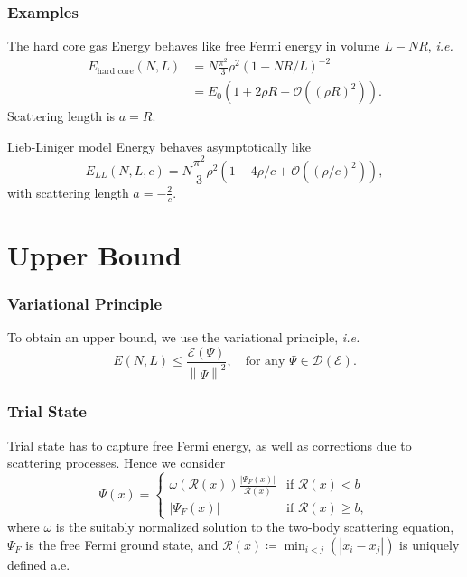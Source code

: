 \documentclass{beamer}[10]
\newcommand{\norm}[1]{\left\lVert #1 \right\rVert}
\newcommand{\abs}[1]{\left\lvert #1 \right\rvert}
\newcommand{\ie}{\emph{i.e.} }
\newcommand{\rr}{\mathcal{R}}
\begin{document}
\begin{frame}
	\frametitle{Examples}
	\small
	\begin{block}{The hard core gas}
		Energy behaves like free Fermi energy in volume $ L-NR $, \ie \begin{equation}
		\begin{aligned}
		E_{\text{hard core}}(N,L)&=N\frac{\pi^2}{3}\rho^2 (1-NR/L)^{-2}\\&= E_0\left(1+2\rho R+\mathcal{O}\left((\rho R)^2\right)\right).
		\end{aligned}
		\end{equation}
		Scattering length is $ a=R $.
	\end{block}
	\begin{block}{Lieb-Liniger model}
		Energy behaves asymptotically like
		\begin{equation}
		E_{LL}(N,L,c)=N\frac{\pi^2}{3}\rho^2\left(1-4\rho/c+\mathcal{O}\left((\rho/c)^2\right)\right),
		\end{equation}
		with scattering length $ a=-\frac{2}{c} $.
	\end{block}
\end{frame}

\section{Upper Bound}

\begin{frame}
	\frametitle{Variational Principle}
	\begin{block}{}
		To obtain an upper bound, we use the variational principle, \ie
		$$
		E(N,L)\leq \frac{\mathcal{E}(\Psi)}{\norm{\Psi}^2},\quad \text{for any }  \Psi\in \mathcal{D}(\mathcal{E}) .
		$$
	\end{block}	
\end{frame}

\begin{frame}
	\frametitle{Trial State}
	\begin{block}{}
		Trial state has to capture free Fermi energy, as well as corrections due to scattering processes. Hence we consider $$
		\Psi(x)=\begin{cases}
		\omega(\rr(x))\frac{\abs{\Psi_F(x)}}{\rr(x)}& \text{if }\rr(x)<b\\
		\abs{\Psi_F(x)}&\text{if }\rr(x)\geq b,
		\end{cases}
		$$
		where $ \omega $ is the suitably normalized solution to the two-body scattering equation,  $\Psi_F$ is the free Fermi ground state, and $ \rr(x)\coloneqq \min_{i<j}(\abs{x_i-x_j}) $ is uniquely defined a.e.
	\end{block}	
\end{frame}
\end{document}
